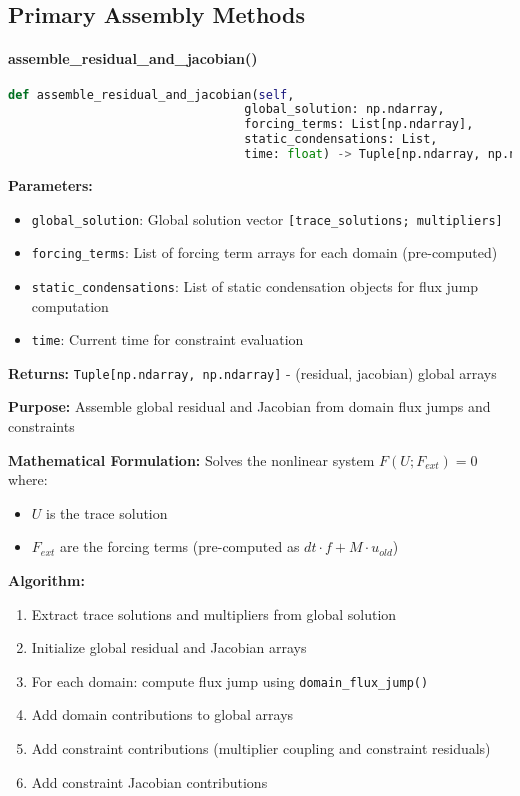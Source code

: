 \subsection{Primary Assembly Methods}
\label{subsec:primary_assembly_methods}

\paragraph{assemble\_residual\_and\_jacobian()}\leavevmode
\begin{lstlisting}[language=Python, caption=Assemble Residual and Jacobian Method]
def assemble_residual_and_jacobian(self, 
                                 global_solution: np.ndarray,
                                 forcing_terms: List[np.ndarray],
                                 static_condensations: List,
                                 time: float) -> Tuple[np.ndarray, np.ndarray]
\end{lstlisting}

\textbf{Parameters:}
\begin{itemize}
    \item \texttt{global\_solution}: Global solution vector \texttt{[trace\_solutions; multipliers]}
    \item \texttt{forcing\_terms}: List of forcing term arrays for each domain (pre-computed)
    \item \texttt{static\_condensations}: List of static condensation objects for flux jump computation
    \item \texttt{time}: Current time for constraint evaluation
\end{itemize}

\textbf{Returns:} \texttt{Tuple[np.ndarray, np.ndarray]} - (residual, jacobian) global arrays

\textbf{Purpose:} Assemble global residual and Jacobian from domain flux jumps and constraints

\textbf{Mathematical Formulation:} Solves the nonlinear system $F(U; F_{ext}) = 0$ where:
\begin{itemize}
    \item $U$ is the trace solution
    \item $F_{ext}$ are the forcing terms (pre-computed as $dt \cdot f + M \cdot u_{old}$)
\end{itemize}

\textbf{Algorithm:}
\begin{enumerate}
    \item Extract trace solutions and multipliers from global solution
    \item Initialize global residual and Jacobian arrays
    \item For each domain: compute flux jump using \texttt{domain\_flux\_jump()}
    \item Add domain contributions to global arrays
    \item Add constraint contributions (multiplier coupling and constraint residuals)
    \item Add constraint Jacobian contributions
\end{enumerate}

